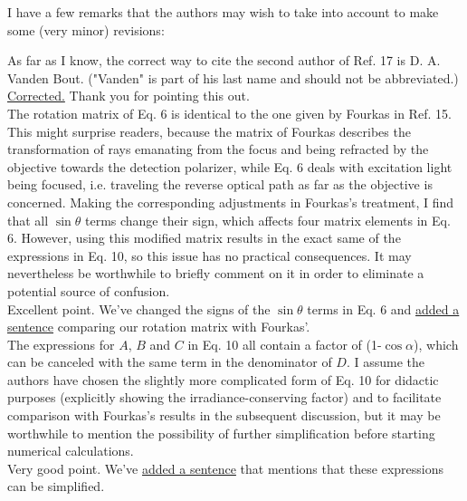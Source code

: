 \documentclass[10pt]{article}
\begin{document}
{\color{OE} I have a few remarks that the authors may wish to take into account
  to make some
  (very minor) revisions:}

{\color{OE} As far as I know, the correct way to cite the second author of Ref. 17 is D.
A. Vanden Bout. ("Vanden" is part of his last name and should not be
abbreviated.)}\\

\hyperlink{vanden}{\color{urlblue} Corrected.} Thank you for pointing this out.\\

{\color{OE} The rotation matrix of Eq. 6 is identical to the one given by
  Fourkas in Ref.  15. This might surprise readers, because the matrix of
  Fourkas describes the transformation of rays emanating from the focus and
  being refracted by the objective towards the detection polarizer, while Eq. 6
  deals with excitation light being focused, i.e. traveling the reverse optical
  path as far as the objective is concerned. Making the corresponding
  adjustments in Fourkas's treatment, I find that all $\sin\theta$ terms change their
  sign, which affects four matrix elements in Eq. 6. However, using this
  modified matrix results in the exact same of the expressions in Eq. 10, so
  this issue has no practical consequences. It may nevertheless be worthwhile to
  briefly comment on it in order to eliminate a potential source of confusion.}\\

Excellent point. We've changed the signs of the $\sin\theta$ terms in Eq. 6 and \hyperlink{signs}{\color{urlblue} added a sentence} comparing our rotation matrix with Fourkas'.\\

{\color{OE} The expressions for $A$, $B$ and $C$ in Eq. 10 all contain a factor
  of (1-$\cos\alpha$), which can be canceled with the same term in the
  denominator of $D$. I assume the authors have chosen the slightly more
  complicated form of Eq. 10 for didactic purposes (explicitly showing the
  irradiance-conserving factor) and to facilitate comparison with Fourkas's
  results in the subsequent discussion, but it may be worthwhile to mention the
  possibility of further simplification before starting
  numerical calculations.}\\

Very good point. We've \hyperlink{dfactor}{\color{urlblue} added a sentence}
that mentions that these expressions can be simplified.\\
\end{document}
